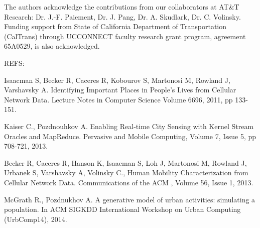 The authors acknowledge the contributions from our collaborators at AT\&T Research: Dr. J.-F. Paiement, Dr. J. Pang, Dr. A. Skudlark, Dr. C. Volinsky. Funding support from State of California Department of Transportation (CalTrans) through UCCONNECT faculty research grant program, agreement 65A0529, is also acknowledged.


REFS:

Isaacman S, Becker R, Caceres R, Kobourov S, Martonosi M, Rowland J, Varshavsky A. Identifying Important Places in People’s Lives from Cellular Network Data. Lecture Notes in Computer Science Volume 6696, 2011, pp 133-151.

Kaiser C., Pozdnouhkov A. Enabling Real-time City Sensing with Kernel Stream Oracles and MapReduce. Pervasive and Mobile Computing, Volume 7, Issue 5, pp 708-721, 2013.

Becker R, Caceres R, Hanson K, Isaacman S, Loh J, Martonosi M, Rowland J, Urbanek S, Varshavsky A, Volinsky C., Human Mobility Characterization from Cellular Network Data. Communications of the ACM , Volume 56, Issue 1, 2013.

McGrath R., Pozdnukhov A. A generative model of urban activities: simulating a population. In ACM SIGKDD International Workshop on Urban Computing (UrbComp14), 2014.        




